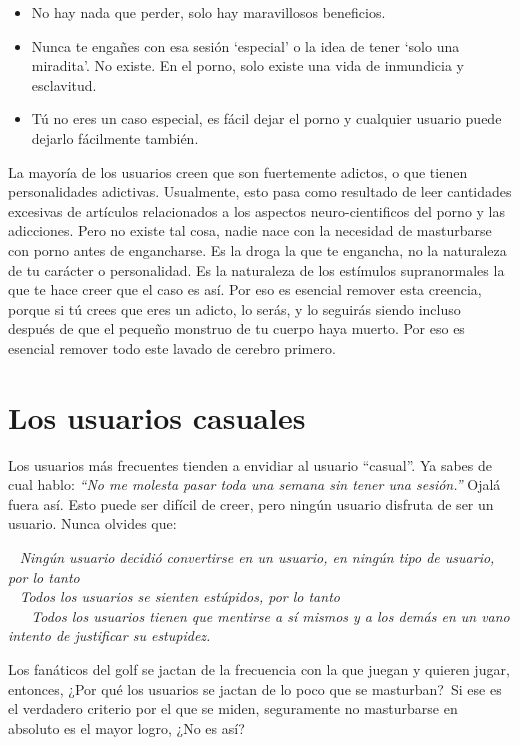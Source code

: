 \documentclass[
]{book}
\providecommand{\tightlist}{%
  \setlength{\itemsep}{0pt}\setlength{\parskip}{0pt}}
\begin{document}
\begin{itemize}
\tightlist
\item
  No hay nada que perder, solo hay maravillosos beneficios.
\item
  Nunca te engañes con esa sesión `especial' o la idea de tener `solo una miradita'. No existe. En el porno, solo existe una vida de inmundicia y esclavitud.
\item
  Tú no eres un caso especial, es fácil dejar el porno y cualquier usuario puede dejarlo fácilmente también.
\end{itemize}

La mayoría de los usuarios creen que son fuertemente adictos, o que tienen personalidades adictivas. Usualmente, esto pasa como resultado de leer cantidades excesivas de artículos relacionados a los aspectos neuro-cientificos del porno y las adicciones. Pero no existe tal cosa, nadie nace con la necesidad de masturbarse con porno antes de engancharse. Es la droga la que te engancha, no la naturaleza de tu carácter o personalidad. Es la naturaleza de los estímulos supranormales la que te hace creer que el caso es así. Por eso es esencial remover esta creencia, porque si tú crees que eres un adicto, lo serás, y lo seguirás siendo incluso después de que el pequeño monstruo de tu cuerpo haya muerto. Por eso es esencial remover todo este lavado de cerebro primero.

\hypertarget{los-usuarios-casuales}{%
\chapter{Los usuarios casuales}\label{los-usuarios-casuales}}

Los usuarios más frecuentes tienden a envidiar al usuario ``casual''. Ya sabes de cual hablo: \emph{``No me molesta pasar toda una semana sin tener una sesión.''} Ojalá fuera así. Esto puede ser difícil de creer, pero ningún usuario disfruta de ser un usuario. Nunca olvides que:~

~ \emph{Ningún usuario decidió convertirse en un usuario, en ningún tipo de usuario, por lo tanto}\\
\hspace*{0.333em} ~ \emph{Todos los usuarios se sienten estúpidos, por lo tanto}\\
\hspace*{0.333em} ~ ~ \emph{Todos los usuarios tienen que mentirse a sí mismos y a los demás en un vano intento de justificar su estupidez.}

Los fanáticos del golf se jactan de la frecuencia con la que juegan y quieren jugar, entonces, ¿Por qué los usuarios se jactan de lo poco que se masturban?~Si ese es el verdadero criterio por el que se miden, seguramente no masturbarse en absoluto es el mayor logro, ¿No es así?
\end{document}
